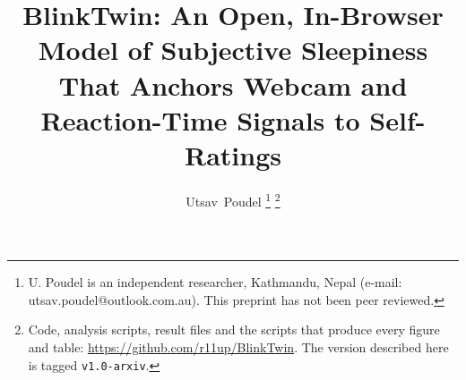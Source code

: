 \documentclass[journal]{IEEEtran}
\begin{document}
\title{BlinkTwin: An Open, In-Browser Model of Subjective Sleepiness That Anchors Webcam and Reaction-Time Signals to Self-Ratings}

\author{Utsav~Poudel%
\thanks{U. Poudel is an independent researcher, Kathmandu, Nepal (e-mail: utsav.poudel@outlook.com.au). This preprint has not been peer reviewed.}%
\thanks{Code, analysis scripts, result files and the scripts that produce every figure and table: \url{https://github.com/r11up/BlinkTwin}. The version described here is tagged \texttt{v1.0-arxiv}.}}


\maketitle















\end{document}
